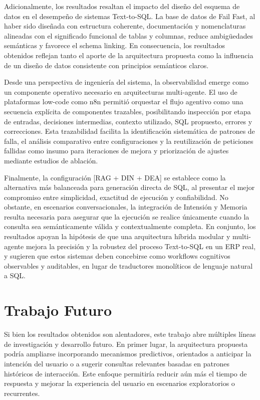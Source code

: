 \documentclass[journal]{IEEEtran}
\begin{document}
Adicionalmente, los resultados resaltan el impacto del diseño del esquema de datos en el desempeño de sistemas Text-to-SQL. La base de datos de Fail Fast, al haber sido diseñada con estructura coherente, documentación y nomenclaturas alineadas con el significado funcional de tablas y columnas, reduce ambigüedades semánticas y favorece el schema linking. En consecuencia, los resultados obtenidos reflejan tanto el aporte de la arquitectura propuesta como la influencia de un diseño de datos consistente con principios semánticos claros.

Desde una perspectiva de ingeniería del sistema, la observabilidad emerge como un componente operativo necesario en arquitecturas multi-agente. El uso de plataformas low-code como n8n permitió orquestar el flujo agentivo como una secuencia explícita de componentes trazables, posibilitando inspección por etapa de entradas, decisiones intermedias, contexto utilizado, SQL propuesto, errores y correcciones. Esta trazabilidad facilita la identificación sistemática de patrones de falla, el análisis comparativo entre configuraciones y la reutilización de peticiones fallidas como insumo para iteraciones de mejora y priorización de ajustes mediante estudios de ablación.

Finalmente, la configuración [RAG + DIN + DEA] se establece como la alternativa más balanceada para generación directa de SQL, al presentar el mejor compromiso entre simplicidad, exactitud de ejecución y confiabilidad. No obstante, en escenarios conversacionales, la integración de Intensión y Memoria resulta necesaria para asegurar que la ejecución se realice únicamente cuando la consulta sea semánticamente válida y contextualmente completa. En conjunto, los resultados apoyan la hipótesis de que una arquitectura híbrida modular y multi-agente mejora la precisión y la robustez del proceso Text-to-SQL en un ERP real, y sugieren que estos sistemas deben concebirse como workflows cognitivos observables y auditables, en lugar de traductores monolíticos de lenguaje natural a SQL.

\section{Trabajo Futuro}

Si bien los resultados obtenidos son alentadores, este trabajo abre múltiples líneas de investigación y desarrollo futuro. En primer lugar, la arquitectura propuesta podría ampliarse incorporando mecanismos predictivos, orientados a anticipar la intención del usuario o a sugerir consultas relevantes basadas en patrones históricos de interacción. Este enfoque permitiría reducir aún más el tiempo de respuesta y mejorar la experiencia del usuario en escenarios exploratorios o recurrentes.
\end{document}
